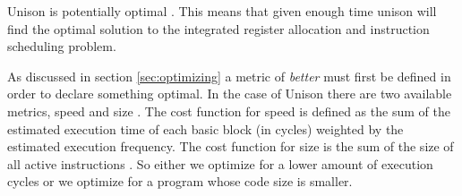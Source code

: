 Unison is potentially optimal \cite{reg-alloc-inst-sched-uni, unison-docs}. This means that
given enough time unison will find the optimal solution to the integrated register allocation
and instruction scheduling problem.

As discussed in section \ref{sec:optimizing} a metric of \textit{better} must first be
defined in order to declare something optimal. In the case of Unison there are two available
metrics, speed and size \cite{unison-docs,reg-alloc-inst-sched-uni}. The cost function for speed
is defined as the sum of the estimated execution time of each basic block (in cycles)
weighted by the estimated execution frequency. The cost function for size is the sum of
the size of all active instructions \cite[Section~3]{reg-alloc-inst-sched-uni}. So either
we optimize for a lower amount of execution cycles or we optimize for a program whose
code size is smaller.
